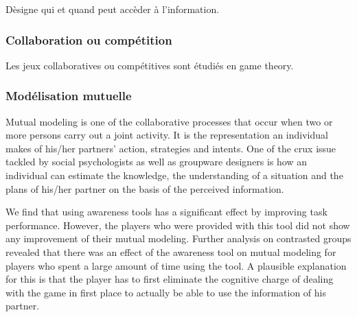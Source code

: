 D\`esigne qui et quand peut acc\`eder \`a l'information.

\subsubsection{Collaboration ou comp\'etition}

Les jeux collaboratives ou comp\'etitives sont \'etudi\'es en game theory.

\subsubsection{Mod\'elisation mutuelle}

Mutual modeling is one of the collaborative processes that occur when two or more persons carry out a joint activity. It is the representation an individual makes of his/her partners' action, strategies and intents. One of the crux issue tackled by social psychologists as well as groupware designers is how an individual can estimate the knowledge, the understanding of a situation and the plans of his/her partner on the basis of the perceived information. 

We find that using awareness tools has a significant effect by improving task performance. However, the players who were provided with this tool did not show any improvement of their mutual modeling. Further analysis on contrasted groups revealed that there was an effect of the awareness tool on mutual modeling for players who spent a large amount of time using the tool. A plausible explanation for this is that the player has to first eliminate the cognitive charge of dealing with the game in first place to actually be able to use the information of his partner.

\begin{figure}[H]
\centering
{}
\end{figure}


